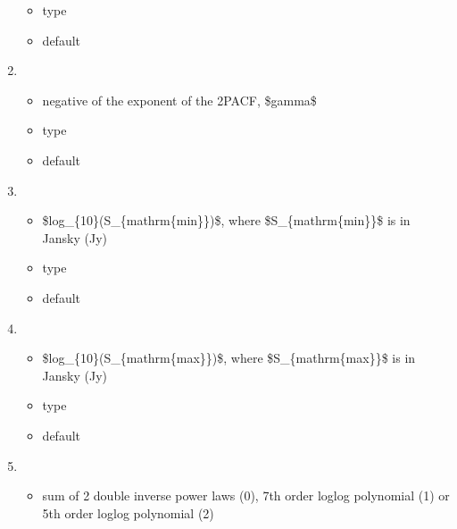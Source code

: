 \documentclass[letterpaper,10pt,english]{sphinxmanual}
\begin{document}
\begin{enumerate}
\begin{itemize}
\item {} 
\sphinxAtStartPar
type 

\item {} 
\sphinxAtStartPar
default 

\end{itemize}

\item {} 
\sphinxAtStartPar
{}
\begin{itemize}
\item {} 
\sphinxAtStartPar
negative of the exponent of the 2PACF, \$gamma\$

\item {} 
\sphinxAtStartPar
type 

\item {} 
\sphinxAtStartPar
default 

\end{itemize}

\item {} 
\sphinxAtStartPar
{}
\begin{itemize}
\item {} 
\sphinxAtStartPar
\$log\_\{10\}(S\_\{mathrm\{min\}\})\$, where \$S\_\{mathrm\{min\}\}\$ is in
Jansky (Jy)

\item {} 
\sphinxAtStartPar
type 

\item {} 
\sphinxAtStartPar
default 

\end{itemize}

\item {} 
\sphinxAtStartPar
{}
\begin{itemize}
\item {} 
\sphinxAtStartPar
\$log\_\{10\}(S\_\{mathrm\{max\}\})\$, where \$S\_\{mathrm\{max\}\}\$ is in
Jansky (Jy)

\item {} 
\sphinxAtStartPar
type 

\item {} 
\sphinxAtStartPar
default 

\end{itemize}

\item {} 
\sphinxAtStartPar
{}
\begin{itemize}
\item {} 
\sphinxAtStartPar
sum of 2 double inverse power laws (0), 7th order log\sphinxhyphen{}log
polynomial (1) or 5th order log\sphinxhyphen{}log polynomial (2)


\end{itemize}
\end{enumerate}
\end{document}
